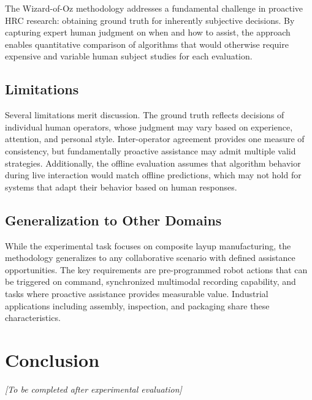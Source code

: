 \documentclass[sensors,article,submit,pdftex,moreauthors]{Definitions/mdpi}
\begin{document}
The Wizard-of-Oz methodology addresses a fundamental challenge in proactive HRC research: obtaining ground truth for inherently subjective decisions. By capturing expert human judgment on when and how to assist, the approach enables quantitative comparison of algorithms that would otherwise require expensive and variable human subject studies for each evaluation.

\subsection{Limitations}

Several limitations merit discussion. The ground truth reflects decisions of individual human operators, whose judgment may vary based on experience, attention, and personal style. Inter-operator agreement provides one measure of consistency, but fundamentally proactive assistance may admit multiple valid strategies. Additionally, the offline evaluation assumes that algorithm behavior during live interaction would match offline predictions, which may not hold for systems that adapt their behavior based on human responses.

\subsection{Generalization to Other Domains}

While the experimental task focuses on composite layup manufacturing, the methodology generalizes to any collaborative scenario with defined assistance opportunities. The key requirements are pre-programmed robot actions that can be triggered on command, synchronized multimodal recording capability, and tasks where proactive assistance provides measurable value. Industrial applications including assembly, inspection, and packaging share these characteristics.

\section{Conclusion}

\textit{[To be completed after experimental evaluation]}

\vspace{6pt}

\end{document}
